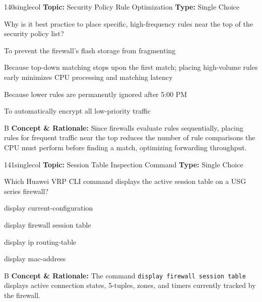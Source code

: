 \begin{qcard}{140}{singlecol}
\textcolor{darkslate!75}{\small\textbf{Topic:} Security Policy Rule Optimization \hfill \textbf{Type:} Single Choice}\vspace{0.4em}\par
Why is it best practice to place specific, high-frequency rules near the top of the security policy list?
\begin{qoptions}
\item To prevent the firewall's flash storage from fragmenting
\item Because top-down matching stops upon the first match; placing high-volume rules early minimizes CPU processing and matching latency
\item Because lower rules are permanently ignored after 5:00 PM
\item To automatically encrypt all low-priority traffic
\end{qoptions}
\end{qcard}
\nopagebreak
\begin{explainbox}{B}
\textbf{Concept \& Rationale:} Since firewalls evaluate rules sequentially, placing rules for frequent traffic near the top reduces the number of rule comparisons the CPU must perform before finding a match, optimizing forwarding throughput.
\end{explainbox}

\begin{qcard}{141}{singlecol}
\textcolor{darkslate!75}{\small\textbf{Topic:} Session Table Inspection Command \hfill \textbf{Type:} Single Choice}\vspace{0.4em}\par
Which Huawei VRP CLI command displays the active session table on a USG series firewall?
\begin{qoptions}
\item display current-configuration
\item display firewall session table
\item display ip routing-table
\item display mac-address
\end{qoptions}
\end{qcard}
\nopagebreak
\begin{explainbox}{B}
\textbf{Concept \& Rationale:} The command \texttt{display firewall session table} displays active connection states, 5-tuples, zones, and timers currently tracked by the firewall.
\end{explainbox}

